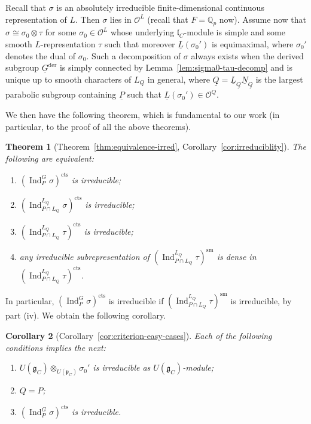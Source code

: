 \documentclass[a4paper]{amsart}
\numberwithin{equation}{section}
\newtheorem{thm}{Theorem}[section]
\newtheorem{cor}[thm]{Corollary}
\theoremstyle{remark}
\theoremstyle{definition}
\DeclareMathOperator{\Ind}{Ind}
\newcommand{\Q}{\mathbb{Q}}
\newcommand{\sm}{\mathrm{sm}}
\newcommand{\alggrp}[1]{\underline{#1}}
\newcommand{\der}{\mathrm{der}}
\newcommand{\cts}{\mathrm{cts}}
\begin{document}
Recall that $\sigma$ is an absolutely irreducible finite-dimensional continuous representation of $L$.
Then $\sigma$ lies in $\mathcal O^L$ (recall that $F = \Q_p$ now). 
Assume now that $\sigma \cong \sigma_0 \otimes \tau$ for some $\sigma_0 \in \mathcal O^L$ whose underlying $\mathfrak l_C$-module is simple and some smooth $L$-representation $\tau$ such that moreover $\underline L(\sigma_0')$ is equimaximal, where $\sigma_0'$ denotes the dual of $\sigma_0$.
Such a decomposition of $\sigma$ always exists when the derived subgroup $\alggrp G^\der$ is simply connected by Lemma~\ref{lem:sigma0-tau-decomp} and is unique up to smooth characters of $L_Q$ in general, where $\alggrp Q = \alggrp L_{\alggrp Q}\alggrp N_{\alggrp Q}$ is the largest parabolic subgroup containing $\alggrp P$ such that $\underline L(\sigma_0') \in \mathcal O^Q$.

We then have the following theorem, which is fundamental to our work (in particular, to the proof of all the above theorems).

\begin{thm}[Theorem~\ref{thm:equivalence-irred}, Corollary~\ref{cor:irreduciblity}]\label{thm:criterion-intro}
  The following are equivalent:
  \begin{enumerate}
  \item $(\Ind_P^G \sigma)^\cts$ is irreducible;
  \item $(\Ind_{P\cap L_Q}^{L_Q} \sigma)^\cts$ is irreducible;
  \item $(\Ind_{P\cap L_Q}^{L_Q} \tau)^\cts$ is irreducible;
  \item any irreducible subrepresentation of $(\Ind_{P\cap L_Q}^{L_Q} \tau)^\sm$ is dense in $(\Ind_{P\cap L_Q}^{L_Q} \tau)^\cts$.
  \end{enumerate}
\end{thm}

In particular, $(\Ind_P^G \sigma)^\cts$ is irreducible if $(\Ind_{P\cap L_Q}^{L_Q} \tau)^\sm$ is irreducible, by part (iv).
We obtain the following corollary.

\begin{cor}[Corollary~\ref{cor:criterion-easy-cases}]\label{cor:criterion-easy-cases-intro}
  Each of the following conditions implies the next:
  \begin{enumerate}
  \item $U(\mathfrak g_C) \otimes_{U(\mathfrak p_C)} \sigma_0'$ is irreducible as $U(\mathfrak g_C)$-module;
  \item $Q = P$;
  \item $(\Ind_P^G \sigma)^\cts$ is irreducible.
  \end{enumerate}
\end{cor}
\end{document}
